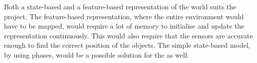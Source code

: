Both a state-based and a feature-based representation of the world suits the project. The feature-based representation, where the entire environment would have to be mapped, would require a lot of memory to initialise and update the representation continuously. This would also require that the sensors are accurate enough to find the correct position of the objects. The simple state-based model, by using phases, would be a possible solution for the \projname{} as well.  

